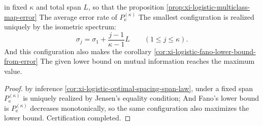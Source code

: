 \begin{corollary}\label{cor:xi-logistic-depth-design-law}
in fixed \(\kappa\) and total span \(L\), so that the proposition \ref{prop:xi-logistic-multiclass-map-error} The average error rate of \(P_{\mathrm e}^{(\kappa)}\) The smallest configuration is realized uniquely by the isometric spectrum:
\[
\sigma_j=\sigma_1+\frac{j-1}{\kappa-1}L\qquad(1\le j\le\kappa).
\]
And this configuration also makes the corollary \ref{cor:xi-logistic-fano-lower-bound-from-error} The given lower bound on mutual information reaches the maximum value.
\end{corollary}
\begin{proof}
by inference \ref{cor:xi-logistic-optimal-spacing-span-law}, under a fixed span \(P_{\mathrm e}^{(\kappa)}\) is uniquely realized by Jensen's equality condition;
And Fano's lower bound is \(P_{\mathrm e}^{(\kappa)}\) decreases monotonically, so the same configuration also maximizes the lower bound. Certification completed.
\end{proof}

